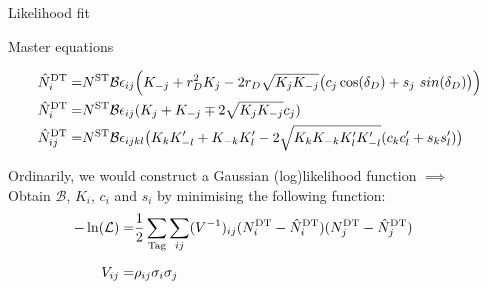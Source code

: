 \documentclass{beamer}
\begin{document}
\begin{frame}{Likelihood fit}
  \begin{block}{Master equations}
    \begin{center}
      \vspace{-0.5cm}
      \begin{align*}
        \hat{N}^{\rm DT}_i =& N^{\rm ST}\mathcal{B}\epsilon_{ij}\Big(K_{-j} + r_D^2K_j - 2r_D\sqrt{K_jK_{-j}}\big(c_j\cos(\delta_D) + s_j\
sin(\delta_D)\big)\Big) \\
        \hat{N}^{\rm DT}_i =& N^{\rm ST}\mathcal{B}\epsilon_{ij}(K_j + K_{-j} \mp 2\sqrt{K_jK_{-j}}c_j) \\
        \hat{N}^{\rm DT}_{ij} =& N^{\rm ST}\mathcal{B}\epsilon_{ijkl}\big(K_{k}K_{-l}^\prime + K_{-k}K_{l}^\prime - 2\sqrt{K_{k}K_{-k}K_{l
}^\prime K_{-l}^\prime}(c_{k}c_{l}^\prime + s_{k}s_{l}^\prime)\big)
      \end{align*}
    \end{center}
  \end{block}
  \vspace{0.5cm}
  \begin{center}
    Ordinarily, we would construct a Gaussian (log)likelihood function $\implies$\\
    Obtain $\mathcal{B}$, $K_i$, $c_i$ and $s_i$ by minimising the following function:
    \begin{align*}
      -\ln(\mathcal{L}) =& \frac{1}{2}\sum_{\rm Tag}\sum_{ij}(V^{-1})_{ij}(N^{\rm DT}_i - \hat{N}^{\rm DT}_i)(N^{\rm DT}_j - \hat{N}^{\rm DT}_j) \\
      V_{ij} =& \rho_{ij}\sigma_i\sigma_j\phantom{, \quad \sigma_i = \sqrt{\sigma_-\sigma_+ - (\sigma_+ - \sigma_-)(N^{\rm DT}_i - \hat{N}^{\rm DT})}}
    \end{align*}
  \end{center}
\end{frame}
\end{document}
